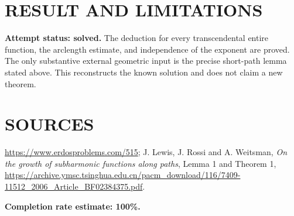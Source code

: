 \section{RESULT AND LIMITATIONS}
\textbf{Attempt status: solved.} The deduction for every transcendental entire function, the arclength estimate, and independence of the exponent are proved. The only substantive external geometric input is the precise short-path lemma stated above. This reconstructs the known solution and does not claim a new theorem.

\section{SOURCES}
\url{https://www.erdosproblems.com/515}; J. Lewis, J. Rossi and A. Weitsman, \emph{On the growth of subharmonic functions along paths}, Lemma 1 and Theorem 1, \url{https://archive.ymsc.tsinghua.edu.cn/pacm_download/116/7409-11512_2006_Article_BF02384375.pdf}.

\textbf{Completion rate estimate: 100\%.}
